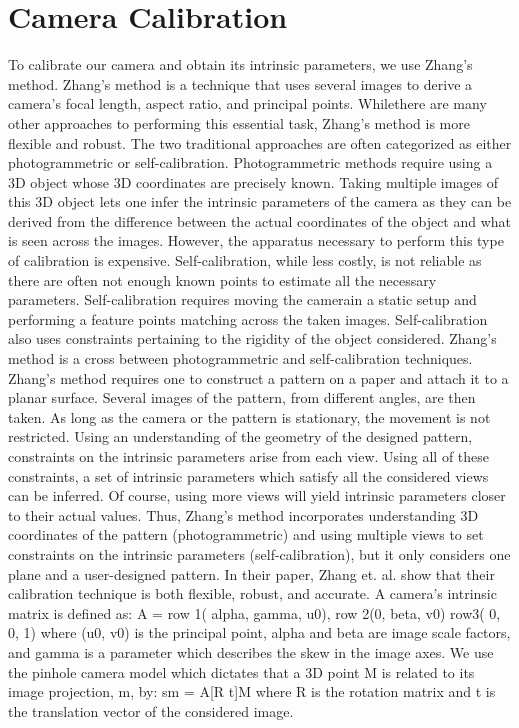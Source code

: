 \section{Camera Calibration}
\label{s:camera}

To calibrate our camera and obtain its intrinsic parameters, we use Zhang’s method. 
Zhang’s method is a technique that uses several images to derive a camera’s focal length, aspect ratio, and principal points. Whilethere are many other approaches to performing this essential task, Zhang’s method is more flexible and robust. The two traditional approaches are often categorized as either photogrammetric or self-calibration. Photogrammetric methods require using a 3D object whose 3D coordinates are precisely known. Taking multiple images of this 3D object lets one infer the intrinsic parameters of the camera as they can be derived from the difference between the actual coordinates of the object and what is seen across the images. However, the apparatus necessary to perform this type of calibration is expensive. Self-calibration, while less costly, is not reliable as there are often not enough known points to estimate all the necessary parameters. Self-calibration requires moving the camerain a static setup and performing a feature points matching across the taken images. Self-calibration also uses constraints pertaining to the rigidity of the object considered.
Zhang’s method is a cross between photogrammetric and self-calibration techniques. Zhang’s method requires one to construct a pattern on a paper and attach it to a planar surface. Several images of the pattern, from different angles, are then taken. As long as the camera or the pattern is stationary, the movement is not restricted. Using an understanding of the geometry of the designed pattern, constraints on the intrinsic parameters arise from each view. Using all of these constraints, a set of intrinsic parameters which satisfy all the considered views can be inferred. Of course, using more views will yield intrinsic parameters closer to their actual values. Thus, Zhang’s method incorporates understanding 3D coordinates of the pattern  (photogrammetric) and using multiple views to set constraints on the intrinsic parameters (self-calibration), but it only considers one plane and a user-designed pattern. In their paper, Zhang et. al. show that their calibration technique is both flexible, robust, and accurate. 
A camera’s intrinsic matrix is defined as: 
A = row 1( alpha, gamma, u0), row 2(0, beta, v0)  row3( 0, 0, 1) where (u0, v0) is the principal point, alpha and beta are image scale factors, and gamma is a parameter which describes the skew in the image axes. We use the pinhole camera model which dictates that a 3D point M is related to its image projection, m, by: sm = A[R t]M where R is the rotation matrix and t is the translation vector of the considered image. 
